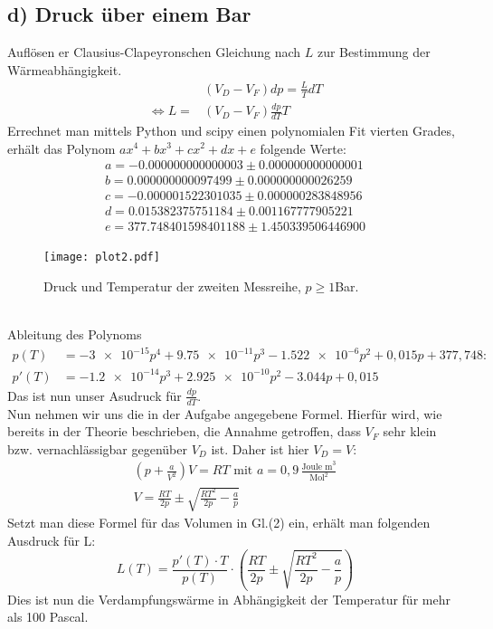 \subsection{d) Druck über einem Bar}
Auflösen er Clausius-Clapeyronschen Gleichung nach $L$ zur Bestimmung der Wärmeabhängigkeit.\\
\begin{align}
  &(V_D-V_F)dp=\frac{L}{T}dT\nonumber\\
  \Leftrightarrow L=&(V_D-V_F)\frac{dp}{dT}T
\end{align}
Errechnet man mittels Python und scipy einen polynomialen Fit vierten Grades, erhält das Polynom $ax^4+bx^3+cx^2+dx+e$ folgende Werte:
\begin{align*}
a = -0.000000000000003 ± 0.000000000000001\\
b = 0.000000000097499 ± 0.000000000026259\\
c = -0.000001522301035 ± 0.000000283848956\\
d = 0.015382375751184 ± 0.001167777905221\\
e = 377.748401598401188 ± 1.450339506446900
\end{align*}
\begin{figure}[h]
    \centering
    \texttt{[image: plot2.pdf]}
    \caption{Druck und Temperatur der zweiten Messreihe, $p\geq 1$Bar.}
\end{figure}
\\
Ableitung des Polynoms 
\begin{align}
p(T)&=-\num{3e-15}p^4+\num{9.75e-11}p^3-\num{1.522e-6}p^2+0,015p+377,748:\nonumber\\
p'(T)&=-\num{1.2e-14}p^3+\num{2.925e-10}p^2-\num{3.044}p+0,015
\end{align}
Das ist nun unser Asudruck für $\frac{dp}{dT}$.\\
Nun nehmen wir uns die in der Aufgabe angegebene Formel. Hierfür wird, wie bereits in der Theorie beschrieben,
die Annahme getroffen, dass $V_F$ sehr klein bzw. vernachlässigbar gegenüber $V_D$ ist. Daher ist hier $V_D=V$:
\begin{align}
  \left(p+\frac{a}{V^2}\right)V=RT\text{  mit  }a=0,9\,\frac{\text{Joule m}^3}{\text{Mol}^2}\nonumber\\
  V=\frac{RT}{2p}\pm\sqrt{\frac{RT^2}{2p}-\frac{a}{p}}
\end{align}
Setzt man diese Formel für das Volumen in Gl.(2) ein, erhält man folgenden Ausdruck für L:
\begin{equation}
  L(T)=\frac{p'(T)\cdot T}{p(T)}\cdot(\frac{RT}{2p}\pm\sqrt{\frac{RT^2}{2p}-\frac{a}{p}})
\end{equation}
Dies ist nun die Verdampfungswärme in Abhängigkeit der Temperatur für mehr als 100 Pascal. 